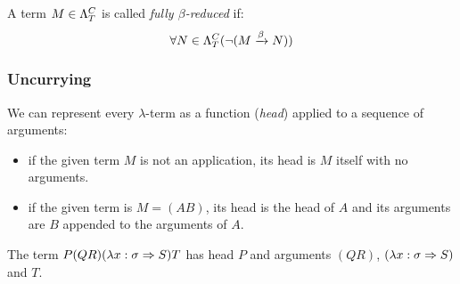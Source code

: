 \documentclass[main.tex]{subfiles}
\begin{document}
\begin{defn}
    A term $M \in \plambda{T}{C}$ is called \emph{fully $\beta$-reduced} if:
    \[ \forall N \in \plambda{T}{C} (\neg (M \betared N)) \]
\end{defn}

\subsubsection{Uncurrying}
We can represent every $\lambda$-term as a function (\emph{head}) applied
to a sequence of arguments:
\begin{itemize}
    \item if the given term $M$ is not an application, its head is $M$ itself
        with no arguments.
    \item if the given term is $M = (AB)$, its head is the head of $A$ and its
        arguments are $B$ appended to the arguments of $A$.
\end{itemize}

\begin{example}
    The term $P (Q R) (\lambda x: \sigma \abstr S) T$ has head $P$ and
    arguments $(Q R)$, $(\lambda x: \sigma \abstr S)$ and $T$.
\end{example}
\end{document}
